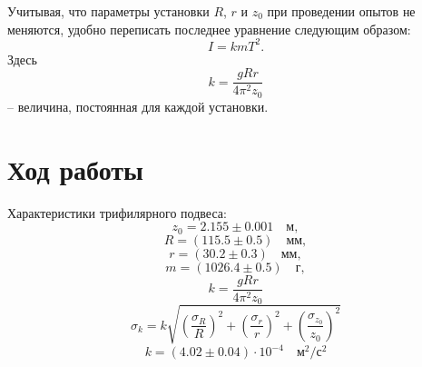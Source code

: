 \documentclass[a4paper,12pt]{article}
\begin{document}
Учитывая, что параметры установки $R$, $r$ и $z_0$ при проведении опытов не меняются, удобно переписать последнее уравнение следующим образом:
\begin{equation}
    I = kmT^2.
\end{equation}
Здесь 
\begin{displaymath}
    k = \frac{gRr}{4\pi^2 z_0}
\end{displaymath}
-- величина, постоянная для каждой установки.


\section{Ход работы}
Характеристики трифилярного подвеса:
\begin{displaymath}
    z_0 = 2.155 \pm 0.001 \quad м, 
\end{displaymath}
\begin{displaymath}
    R = (115.5 \pm 0.5) \quad мм,
\end{displaymath}
\begin{displaymath}
    r = (30.2 \pm 0.3) \quad мм,
\end{displaymath}
\begin{displaymath}
    m =(1026.4 \pm 0.5) \quad г,
\end{displaymath}
\begin{displaymath}
    k = \frac{gRr}{4\pi^2 z_0}
\end{displaymath}
\begin{displaymath}
    \sigma_k = k  \sqrt{\left( \dfrac{\sigma_R}{R}\right)^2 + \left( \dfrac{\sigma_r}{r}\right)^2 + \left( \dfrac{\sigma_{z_0}}{z_0}\right)^2}
\end{displaymath}
\begin{displaymath}
    k = (4.02\pm 0.04) \cdot 10^{-4} \quad м^2/с^2
\end{displaymath}
\end{document}
